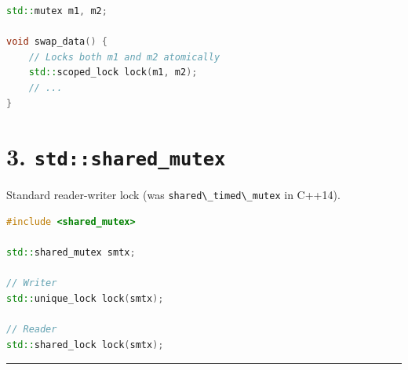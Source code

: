 \begin{lstlisting}[language={C++}]
std::mutex m1, m2;

void swap_data() {
    // Locks both m1 and m2 atomically
    std::scoped_lock lock(m1, m2); 
    // ...
}
\end{lstlisting}

\hypertarget{stdshared_mutex}{%
\section{\texorpdfstring{3.
\texttt{std::shared\_mutex}}{3. std::shared\_mutex}}\label{stdshared_mutex}}

Standard reader-writer lock (was
\passthrough{\lstinline!shared\_timed\_mutex!} in C++14).

\begin{lstlisting}[language={C++}]
#include <shared_mutex>

std::shared_mutex smtx;

// Writer
std::unique_lock lock(smtx);

// Reader
std::shared_lock lock(smtx);
\end{lstlisting}

\begin{center}\rule{0.5\linewidth}{0.5pt}\end{center}

